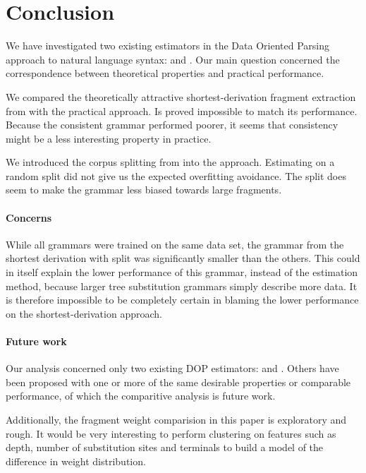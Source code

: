 \section{Conclusion}

We have investigated two existing estimators in the Data Oriented Parsing approach to natural language syntax: \ddop{} and \dops. Our main question concerned the correspondence between theoretical properties and practical performance. 

We compared the theoretically attractive shortest-derivation fragment extraction from \dops{} with the practical \ddop{} approach. Is proved impossible to match its performance. Because the consistent grammar performed poorer, it seems that consistency might be a less interesting property in practice.

We introduced the corpus splitting from \dops{} into the \ddop{} approach. Estimating on a random split did not give us the expected overfitting avoidance. The split does seem to make the grammar less biased towards large fragments. 

\paragraph{Concerns}
While all grammars were trained on the same data set, the grammar from the shortest derivation with split was significantly smaller than the others. This could in itself explain the lower performance of this grammar, instead of the estimation method, because larger tree substitution grammars simply describe more data. It is therefore impossible to be completely certain in blaming the lower performance on the shortest-derivation approach.


\paragraph{Future work}
Our analysis concerned only two existing DOP estimators: \ddop{} and \dops{}. Others have been proposed with one or more of the same desirable properties or comparable performance, of which the comparitive analysis is future work.

Additionally, the fragment weight comparision in this paper is exploratory and rough. It would be very interesting to perform clustering on features such as depth, number of substitution sites and terminals to build a model of the difference in weight distribution.

